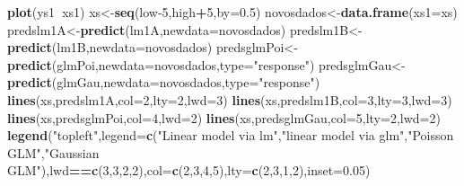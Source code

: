 \documentclass[
]{book}
\newenvironment{Shaded}{\begin{snugshade}}{\end{snugshade}}
\newcommand{\DataTypeTok}[1]{\textcolor[rgb]{0.13,0.29,0.53}{#1}}
\newcommand{\DecValTok}[1]{\textcolor[rgb]{0.00,0.00,0.81}{#1}}
\newcommand{\FloatTok}[1]{\textcolor[rgb]{0.00,0.00,0.81}{#1}}
\newcommand{\KeywordTok}[1]{\textcolor[rgb]{0.13,0.29,0.53}{\textbf{#1}}}
\newcommand{\NormalTok}[1]{#1}
\newcommand{\OperatorTok}[1]{\textcolor[rgb]{0.81,0.36,0.00}{\textbf{#1}}}
\newcommand{\StringTok}[1]{\textcolor[rgb]{0.31,0.60,0.02}{#1}}
\begin{document}
\begin{Shaded}
\begin{Highlighting}[]
\KeywordTok{plot}\NormalTok{(ys1}\OperatorTok{~}\NormalTok{xs1)}
\NormalTok{xs<-}\KeywordTok{seq}\NormalTok{(low}\DecValTok{-5}\NormalTok{,high}\OperatorTok{+}\DecValTok{5}\NormalTok{,}\DataTypeTok{by=}\FloatTok{0.5}\NormalTok{)}
\NormalTok{novosdados<-}\KeywordTok{data.frame}\NormalTok{(}\DataTypeTok{xs1=}\NormalTok{xs)}
\NormalTok{predslm1A<-}\KeywordTok{predict}\NormalTok{(lm1A,}\DataTypeTok{newdata=}\NormalTok{novosdados)}
\NormalTok{predslm1B<-}\KeywordTok{predict}\NormalTok{(lm1B,}\DataTypeTok{newdata=}\NormalTok{novosdados)}
\NormalTok{predsglmPoi<-}\KeywordTok{predict}\NormalTok{(glmPoi,}\DataTypeTok{newdata=}\NormalTok{novosdados,}\DataTypeTok{type=}\StringTok{"response"}\NormalTok{)}
\NormalTok{predsglmGau<-}\KeywordTok{predict}\NormalTok{(glmGau,}\DataTypeTok{newdata=}\NormalTok{novosdados,}\DataTypeTok{type=}\StringTok{"response"}\NormalTok{)}
\KeywordTok{lines}\NormalTok{(xs,predslm1A,}\DataTypeTok{col=}\DecValTok{2}\NormalTok{,}\DataTypeTok{lty=}\DecValTok{2}\NormalTok{,}\DataTypeTok{lwd=}\DecValTok{3}\NormalTok{)}
\KeywordTok{lines}\NormalTok{(xs,predslm1B,}\DataTypeTok{col=}\DecValTok{3}\NormalTok{,}\DataTypeTok{lty=}\DecValTok{3}\NormalTok{,}\DataTypeTok{lwd=}\DecValTok{3}\NormalTok{)}
\KeywordTok{lines}\NormalTok{(xs,predsglmPoi,}\DataTypeTok{col=}\DecValTok{4}\NormalTok{,}\DataTypeTok{lwd=}\DecValTok{2}\NormalTok{)}
\KeywordTok{lines}\NormalTok{(xs,predsglmGau,}\DataTypeTok{col=}\DecValTok{5}\NormalTok{,}\DataTypeTok{lty=}\DecValTok{2}\NormalTok{,}\DataTypeTok{lwd=}\DecValTok{2}\NormalTok{)}
\KeywordTok{legend}\NormalTok{(}\StringTok{"topleft"}\NormalTok{,}\DataTypeTok{legend=}\KeywordTok{c}\NormalTok{(}\StringTok{"Linear model via lm"}\NormalTok{,}\StringTok{"linear model via glm"}\NormalTok{,}\StringTok{"Poisson GLM"}\NormalTok{,}\StringTok{"Gaussian GLM"}\NormalTok{),lwd}\OperatorTok{==}\KeywordTok{c}\NormalTok{(}\DecValTok{3}\NormalTok{,}\DecValTok{3}\NormalTok{,}\DecValTok{2}\NormalTok{,}\DecValTok{2}\NormalTok{),}\DataTypeTok{col=}\KeywordTok{c}\NormalTok{(}\DecValTok{2}\NormalTok{,}\DecValTok{3}\NormalTok{,}\DecValTok{4}\NormalTok{,}\DecValTok{5}\NormalTok{),}\DataTypeTok{lty=}\KeywordTok{c}\NormalTok{(}\DecValTok{2}\NormalTok{,}\DecValTok{3}\NormalTok{,}\DecValTok{1}\NormalTok{,}\DecValTok{2}\NormalTok{),}\DataTypeTok{inset=}\FloatTok{0.05}\NormalTok{)}
\end{Highlighting}
\end{Shaded}
\end{document}
